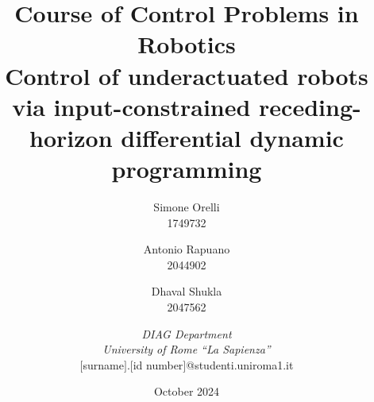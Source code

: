 \documentclass{article}
\title{\large Course of Control Problems in Robotics \\ \LARGE Control of underactuated robots via input-constrained receding-horizon differential dynamic programming}
\author{Simone Orelli\\1749732 
\and Antonio Rapuano\\2044902
\and Dhaval Shukla \\2047562 \and \textit{DIAG Department}\\ \textit{University of Rome “La Sapienza”}\\ $[$surname$]$.$[$id number$]$@studenti.uniroma1.it}
\date{October 2024}
\numberwithin{figure}{section}
\numberwithin{table}{section}
\numberwithin{equation}{section}
\begin{document}
    \maketitle
    \thispagestyle{empty}
        \begin{multicols}{2}
            \vfill\null\null
        
        \vfill\null
        \columnbreak
        \tableofcontents

        \newpage
        
        
        
        
        
        \printbibliography
    \end{multicols}
\end{document}
